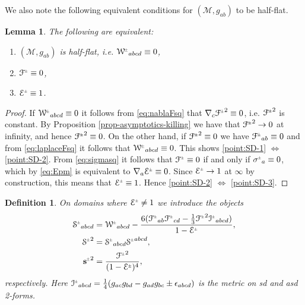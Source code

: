 \documentclass[a4paper,11pt,reqno]{amsart}
\newcommand{\Scal}{\mathop{\rm Scal}}
\newcommand{\cE}{\mathcal{E}}
\newcommand{\cM}{\mathcal{M}}
\theoremstyle{plain}
\newtheorem{lemma}[thm]{Lemma}
\newtheorem{definition}[thm]{Definition}
\newcommand{\PM}[1]{{{#1}^{\hspace{-.5pt}\scaleto{\pm}{3.5pt}}}}
\def\Wcal{\mathcal{W}}
\def\Fcal{\mathcal{F}}
\def\Ecal{\mathcal{E}}
\def\Scal{\mathcal{S}}
\def\Ical{\mathcal{I}}
\def\sbold{\mathbf{s}}
\numberwithin{equation}{section}
\begin{document}
We also note the following equivalent conditions for $(\cM, g_{ab})$ to be half-flat. 
\begin{lemma} \label{prop:SD-characterizations}
The following are equivalent:
\begin{enumerate} 
\item \label{point:SD-1} $(\cM, g_{ab})$ is half-flat, i.e. $\PM{\Wcal}_{abcd} \equiv 0$,
\item \label{point:SD-2} $\PM{\Fcal} \equiv 0$, 
\item \label{point:SD-3} $\PM{\cE} \equiv 1$.
\end{enumerate}
\end{lemma}

\begin{proof}
If $\PM{\Wcal}_{abcd} \equiv 0$ it follows from \eqref{eq:nablaFsq} that $\nabla_{c}\PM{\Fcal}^2 \equiv 0$, i.e. $\PM{\Fcal}^2$ is constant. By Proposition \ref{prop-asymptotics-killing} we have that $\PM{\Fcal}^2 \to 0$ at infinity, and hence $\PM{\Fcal}^2 \equiv 0$.
On the other hand, if $\PM{\Fcal}^2 \equiv 0$ we have $\PM{\Fcal}_{ab} \equiv 0$ and from \eqref{eq:laplaceFsq} it follows that $\PM{\Wcal}_{abcd} \equiv 0$. This shows \eqref{point:SD-1} $\Leftrightarrow$ \eqref{point:SD-2}. 
From \eqref{eq:sigmasq} it follows that $\PM{\Fcal} \equiv 0$ if and only if $\PM{\sigma}_{a} \equiv 0$, which by \eqref{eq:Epm} is equivalent to  $\nabla_{a}\PM{\Ecal} \equiv 0$. Since $\PM{\Ecal} \to 1$ at $\infty$ by construction, this means that $\PM{\Ecal} \equiv 1$. Hence \eqref{point:SD-2} $\Leftrightarrow$ \eqref{point:SD-3}.  
\end{proof}



\begin{definition}\label{def:mst}
On domains where $\PM{\Ecal} \neq 1$ we introduce the objects
\begin{subequations}
\begin{align}
\label{mst}
\PM{\Scal}_{abcd}={}&\PM{\Wcal}_{abcd} - \frac{6 (\PM{\Fcal}_{ab} \PM{\Fcal}_{cd} -  \tfrac{1}{3} \PM{\Fcal}^2 \PM{\Ical}_{abcd})}{1 -  \PM{\Ecal}}, \\
\PM{\Scal}^2={}&\PM{\Scal}_{abcd} \PM{\Scal}^{abcd}, \\
\PM{\sbold}^2={}&\frac{\PM{\Fcal}^2}{(1 -  \PM{\Ecal})^4}, \label{eq:MSscalar}
\end{align}
\end{subequations}
respectively. Here $\PM{\Ical}_{abcd}= \tfrac{1}{4} ( g_{ac} g_{bd} -  g_{ad} g_{bc} \pm \epsilon_{abcd} )$ is the metric on sd and asd 2-forms.
\end{definition}
\end{document}
